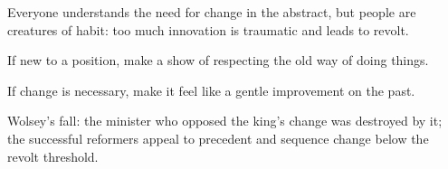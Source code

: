 

\begin{distilled}
  \item Everyone understands the need for change in the abstract, but people are creatures of habit: too much innovation is traumatic and leads to revolt.
  \item If new to a position, make a show of respecting the old way of doing things.
  \item If change is necessary, make it feel like a gentle improvement on the past.
  \item Wolsey's fall: the minister who opposed the king's change was destroyed by it; the successful reformers appeal to precedent and sequence change below the revolt threshold.
\end{distilled}
